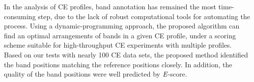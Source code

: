 In the analysis of CE profiles, band annotation has remained the most time-consuming step, due to the lack of robust computational tools for automating the process. Using a dynamic-programming approach, the proposed algorithm can find an optimal arrangements of bands in a given CE profile, under a scoring scheme suitable for high-throughput CE experiments with multiple profiles. Based on our tests with nearly 100 CE data sets, the proposed method identified the band positions matching the reference positions closely. In addition, the quality of the band positions were well predicted by ${\emph{E}}$-score.
